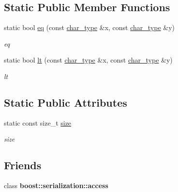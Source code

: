 \subsection*{Static Public Member Functions}
\begin{DoxyCompactItemize}
\item 
static bool \hyperlink{class_transition_aff29b326d916908afcbb377178d34e43}{eq} (const \hyperlink{class_transition_a701b8dd85eadbda28008778631ed9c08}{char\+\_\+type} \&x, const \hyperlink{class_transition_a701b8dd85eadbda28008778631ed9c08}{char\+\_\+type} \&y)
\begin{DoxyCompactList}\small\item\em eq \end{DoxyCompactList}\item 
static bool \hyperlink{class_transition_ad1b2ae9ff8cde5bb8888fb6002cfa671}{lt} (const \hyperlink{class_transition_a701b8dd85eadbda28008778631ed9c08}{char\+\_\+type} \&x, const \hyperlink{class_transition_a701b8dd85eadbda28008778631ed9c08}{char\+\_\+type} \&y)
\begin{DoxyCompactList}\small\item\em lt \end{DoxyCompactList}\end{DoxyCompactItemize}
\subsection*{Static Public Attributes}
\begin{DoxyCompactItemize}
\item 
static const size\+\_\+t \hyperlink{class_transition_a579785c1d2d34e7dab5d34495041e004}{size}\hypertarget{class_transition_a579785c1d2d34e7dab5d34495041e004}{}\label{class_transition_a579785c1d2d34e7dab5d34495041e004}

\begin{DoxyCompactList}\small\item\em size \end{DoxyCompactList}\end{DoxyCompactItemize}
\subsection*{Friends}
\begin{DoxyCompactItemize}
\item 
class {\bfseries boost\+::serialization\+::access}\hypertarget{class_transition_ac98d07dd8f7b70e16ccb9a01abf56b9c}{}\label{class_transition_ac98d07dd8f7b70e16ccb9a01abf56b9c}

\end{DoxyCompactItemize}


